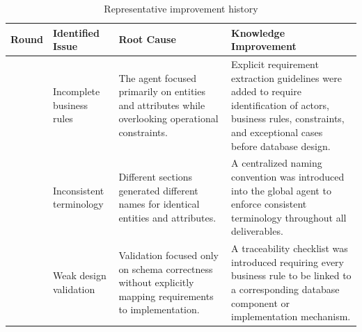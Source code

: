 \begin{table}[H]

	\centering

	\caption{Representative improvement history}

	\label{tab:history}

	\begin{tabularx}{\linewidth}
		{>{\centering\arraybackslash}p{1.2cm}
		>{\raggedright\arraybackslash}p{3cm}
		X
		X}

		\toprule

		\textbf{Round}
		 &
		\textbf{Identified Issue}
		 &
		\textbf{Root Cause}
		 &
		\textbf{Knowledge Improvement}

		\\

		\midrule

		1

		 &

		Incomplete business rules

		 &

		The agent focused primarily on entities and attributes while overlooking operational constraints.

		 &

		Explicit requirement extraction guidelines were added to require identification of actors, business rules, constraints, and exceptional cases before database design.

		\\

		2

		 &

		Inconsistent terminology

		 &

		Different sections generated different names for identical entities and attributes.

		 &

		A centralized naming convention was introduced into the global agent to enforce consistent terminology throughout all deliverables.

		\\

		3

		 &

		Weak design validation

		 &

		Validation focused only on schema correctness without explicitly mapping requirements to implementation.

		 &

		A traceability checklist was introduced requiring every business rule to be linked to a corresponding database component or implementation mechanism.

		\\

		\bottomrule
	\end{tabularx}

\end{table}


